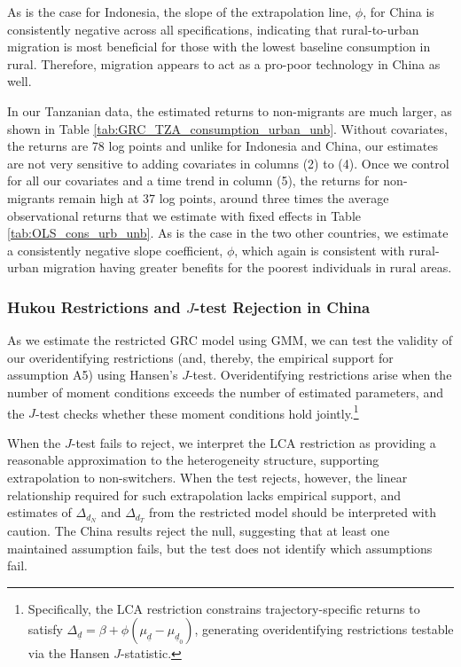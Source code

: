 \documentclass[12pt]{article}
\begin{document}
As is the case for Indonesia, the slope of the extrapolation line, $\phi$, for China is consistently negative across all specifications, indicating that rural-to-urban migration is most beneficial for those with the lowest baseline consumption in rural.
Therefore, migration appears to act as a pro-poor technology in China as well.

In our Tanzanian data, the estimated returns to non-migrants are much larger, as shown in Table \ref{tab:GRC_TZA_consumption_urban_unb}. 
Without covariates, the returns are 78 log points and unlike for Indonesia and China, our estimates are not very sensitive to adding covariates in columns (2) to (4). 
Once we control for all our covariates and a time trend in column (5), the returns for non-migrants remain high at 37 log points, around three times the average observational returns that we estimate with fixed effects in Table \ref{tab:OLS_cons_urb_unb}.
As is the case in the two other countries, we estimate a consistently negative slope coefficient, $\phi$, which again is consistent with rural-urban migration having greater benefits for the poorest individuals in rural areas.

\subsubsection{Hukou Restrictions and $J$-test Rejection in China}\label{sec:hukou}

As we estimate the restricted GRC model using GMM, we can test the validity of our overidentifying restrictions (and, thereby, the empirical support for assumption A5) using Hansen's $J$-test. 
Overidentifying restrictions arise when the number of moment conditions exceeds the number of estimated parameters, and the $J$-test checks whether these moment conditions hold jointly.\footnote{Specifically, the LCA restriction constrains trajectory-specific returns to satisfy $\Delta_{\underline{d}} = \beta + \phi(\mu_{\underline{d}} - \mu_{\underline{d}_0})$, generating overidentifying restrictions testable via the Hansen $J$-statistic. }

When the $J$-test fails to reject, we interpret the LCA restriction as providing a reasonable approximation to the heterogeneity structure, supporting extrapolation to non-switchers. 
When the test rejects, however, the linear relationship required for such extrapolation lacks empirical support, and estimates of $\Delta_{d_N}$ and $\Delta_{d_T}$ from the restricted model should be interpreted with caution.
The China results reject the null, suggesting that at least one maintained assumption fails, but the test does not identify which assumptions fail. 
\end{document}
